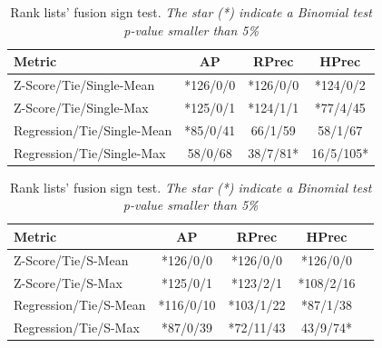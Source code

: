 \begin{table}
  \vspace{0.5cm}

\end{table}

\begin{table}
  \centering
  \caption{Rank lists' fusion sign test. \textit{The star (*) indicate a Binomial test p-value smaller than 5\%}}
  \label{tab:fusion_sign_test}

  \label{tab:fusion_A}
  \begin{tabular}{l c c c}
    \toprule
    Metric
    & AP
    & RPrec
    & HPrec \\
    \midrule
    Z-Score/Tie/Single-Mean    & *126/0/0 & *126/0/0 & *124/0/2 \\
    Z-Score/Tie/Single-Max     & *125/0/1 & *124/1/1 & *77/4/45 \\
    Regression/Tie/Single-Mean & *85/0/41 & 66/1/59  & 58/1/67  \\
    Regression/Tie/Single-Max  & 58/0/68  & 38/7/81* & 16/5/105* \\
    \bottomrule
  \end{tabular}

  \vspace{0.5cm}

  \label{tab:fusion_B}
  \begin{tabular}{l c c c c}
    \toprule
    Metric
    & AP
    & RPrec
    & HPrec \\
    \midrule
    Z-Score/Tie/S-Mean    & *126/0/0  & *126/0/0  & *126/0/0 \\
    Z-Score/Tie/S-Max     & *125/0/1  & *123/2/1  & *108/2/16\\
    Regression/Tie/S-Mean & *116/0/10 & *103/1/22 & *87/1/38 \\
    Regression/Tie/S-Max  & *87/0/39  & *72/11/43 & 43/9/74* \\
    \bottomrule
  \end{tabular}

\end{table}

